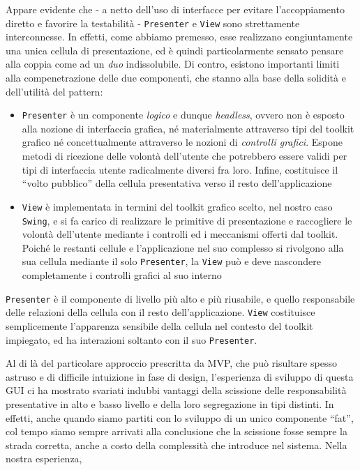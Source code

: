 Appare evidente che - a netto dell'uso di interfacce per evitare l'accoppiamento diretto e favorire la testabilità - \texttt{Presenter} e \texttt{View} sono strettamente interconnesse. In effetti, come abbiamo premesso, esse realizzano congiuntamente una unica cellula di presentazione, ed è quindi particolarmente sensato pensare alla coppia come ad un \emph{duo} indissolubile. 
Di contro, esistono importanti limiti alla compenetrazione delle due componenti, che stanno alla base della solidità e dell'utilità del pattern:
\begin{itemize}
	\item \texttt{Presenter} è un componente \emph{logico} e dunque \emph{headless}, ovvero non è esposto alla nozione di interfaccia grafica, né materialmente attraverso tipi del toolkit grafico né concettualmente attraverso le nozioni di \emph{controlli grafici}. Espone metodi di ricezione delle volontà dell'utente che potrebbero essere validi per tipi di interfaccia utente radicalmente diversi fra loro. Infine, costituisce il ``volto pubblico'' della cellula presentativa verso il resto dell'applicazione 
	\item \texttt{View} è implementata in termini del toolkit grafico scelto, nel nostro caso \texttt{Swing}, e si fa carico di realizzare le primitive di presentazione e raccogliere le volontà dell'utente mediante i controlli ed i meccanismi offerti dal toolkit. Poiché le restanti cellule e l'applicazione nel suo complesso si rivolgono alla sua cellula mediante il solo \texttt{Presenter}, la \texttt{View} può e deve nascondere completamente i controlli grafici al suo interno
\end{itemize}
\texttt{Presenter} è il componente di livello più alto e più riusabile, e quello responsabile delle relazioni della cellula con il resto dell'applicazione. \texttt{View} costituisce semplicemente l'apparenza sensibile della cellula nel contesto del toolkit impiegato, ed ha interazioni soltanto con il suo \texttt{Presenter}.

\medskip
Al di là del particolare approccio prescritta da MVP, che può risultare spesso astruso e di difficile intuizione in fase di design, l'esperienza di sviluppo di questa GUI ci ha mostrato svariati indubbi vantaggi della scissione delle responsabilità presentative in alto e basso livello e della loro segregazione in tipi distinti. In effetti, anche quando siamo partiti con lo sviluppo di un unico componente ``fat'', col tempo siamo sempre arrivati alla conclusione che la scissione fosse sempre la strada corretta, anche a costo della complessità che introduce nel sistema. Nella nostra esperienza,

